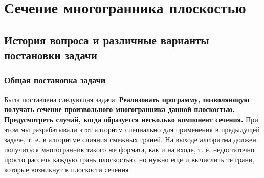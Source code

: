 \documentclass[a4paper,12pt, titlepage]{article}
\begin{document}




\newpage
\section{Сечение многогранника плоскостью}

\subsection{История вопроса и различные варианты постановки задачи}

\subsubsection{Общая постановка задачи}
\begin{flushleft}
	Была поставлена следующая задача: \textbf{Реализовать программу, позволяющую получать 
сечение произвольного многогранника данной плоскостью. Предусмотреть случай, когда образуется несколько компонент сечения.}
При этом мы разрабатывали этот алгоритм специально для применения в предыдущей задаче, т. е. в 
алгоритме слияния смежных граней. На выходе алгоритма должен получиться многогранник такого же формата, как и на входе,
т. е. недостаточно просто рассечь каждую грань плоскостью, но нужно еще и вычислить те грани, которые возникнут в 
плоскости сечения
\end{flushleft}
\end{document}
